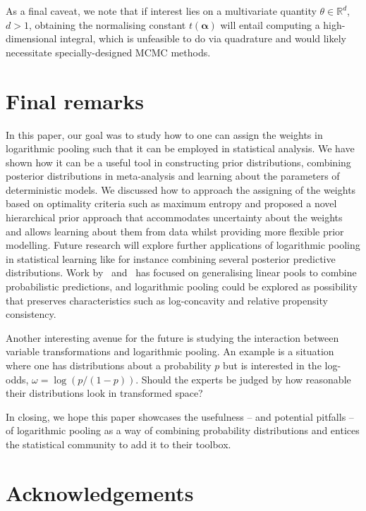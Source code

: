\documentclass[a4paper, notitlepage, 10pt]{article}
\begin{document}
As a final caveat, we note that if interest lies on a multivariate quantity $\theta \in \mathbb{R}^d$, $d>1$, obtaining the normalising constant $t(\boldsymbol\alpha)$ will entail computing a high-dimensional integral, which is unfeasible to do via quadrature and would likely necessitate specially-designed MCMC methods.

\section{Final remarks}
\label{sec:conclusion}

In this paper, our goal was to study how to one can assign the weights in logarithmic pooling such that it can be employed in statistical analysis.
We have shown how it can be a useful tool in constructing prior distributions, combining posterior distributions in meta-analysis and learning about the parameters of deterministic models.
We discussed how to approach the assigning of the weights based on optimality criteria such as maximum entropy and proposed a novel hierarchical prior approach that accommodates uncertainty about the weights and allows learning about them from data whilst providing more flexible prior modelling.
Future research will explore further applications of logarithmic pooling in statistical learning like for instance combining several posterior predictive distributions.
Work by~\cite{Johnson2018} and~\cite{Yao2018} has focused on generalising linear pools to combine probabilistic predictions, and logarithmic pooling could be explored as possibility that preserves characteristics such as log-concavity and relative propensity consistency.

Another interesting avenue for the future is studying the interaction between variable transformations and logarithmic pooling.
An example is a situation where one has distributions about a probability $p$ but is interested in the log-odds, $\omega = \log(p/(1-p))$.
Should the experts be judged by how reasonable their distributions look in transformed space?

In closing, we hope this paper showcases the usefulness -- and potential pitfalls -- of logarithmic pooling as a way of combining probability distributions and entices the statistical community to add it to their toolbox.


\section*{Acknowledgements}
\end{document}
